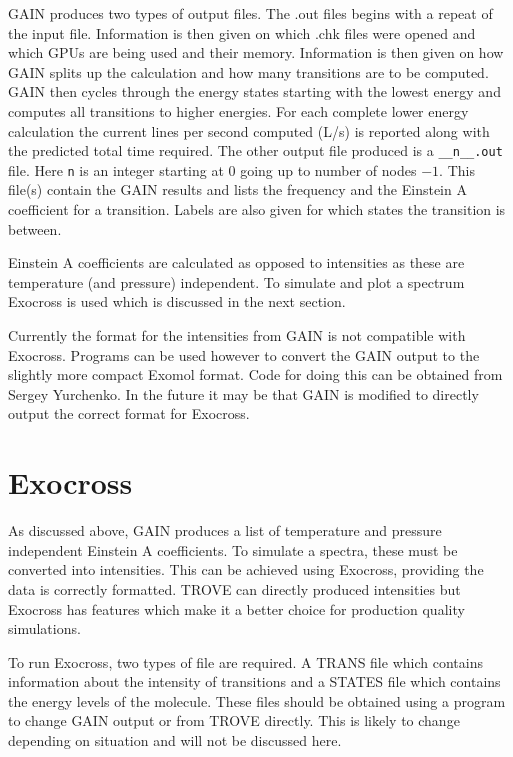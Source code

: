 GAIN produces two types of output files. The .out files begins with a repeat of the input file. Information is then given on
which .chk files were opened and which GPUs are being used and their memory. Information is then given on how GAIN
splits up the calculation and how many transitions are to be computed. GAIN then cycles through the energy states starting
with the lowest energy and computes all transitions to higher energies. For each complete lower energy calculation 
the current lines per second computed (L/s) is reported along with the predicted total time required. The other output
file produced is a \verb|__n__.out| file. Here \verb|n| is an integer starting at 0 going up to number of nodes $-1$. This 
file(s) contain the GAIN results and lists the frequency and the Einstein A coefficient \cite{98BuJexx} 
for a transition. Labels are also given for which states the transition is between. 

Einstein A coefficients are calculated as opposed to intensities as these are temperature (and pressure) independent. To 
simulate and plot a spectrum Exocross is used which is discussed in the next section.


Currently the format for the intensities from GAIN is not compatible with Exocross. Programs can be used however to convert
the GAIN output to the slightly more compact Exomol format.\cite{jt631} 
Code for doing this can be obtained from Sergey Yurchenko.
In the future it may be that GAIN is modified to directly output the correct format for Exocross.


\section{Exocross}

As discussed above, GAIN produces a list of temperature and pressure independent Einstein A coefficients. To simulate a 
spectra, these must be converted into intensities. This can be achieved using Exocross, providing the data is correctly
formatted. TROVE can directly produced intensities but Exocross has features which make it a better choice for production
quality simulations.

To run Exocross, two types of file are required. A TRANS file which contains information about the intensity of transitions
and a STATES file which contains the energy levels of the molecule. These files should be obtained using a program to change
GAIN output or from TROVE directly. This is likely to change depending on situation and will not be discussed here.

